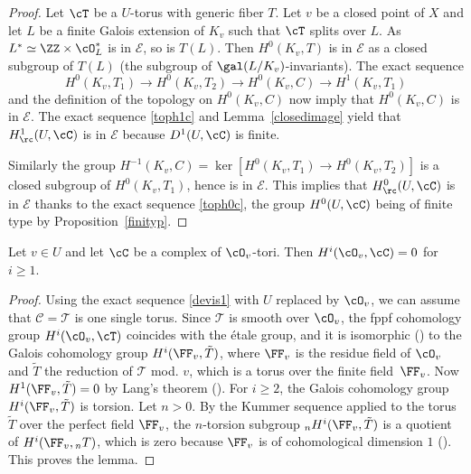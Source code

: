\begin{proof} Let $\cT$ be a
$U$-torus with generic fiber $T$.
Let $v$ be a closed point of $X$ and let $L$ be a finite
Galois extension of $K_v$ such
that $\cT$ splits over $L$. As $L^* \simeq \ZZ \times \cO_L^*$
is in $\mathcal E$, so is $T(L)$.
Then $H^0(K_v,T)$ is in $\mathcal E$
as a closed subgroup of $T(L)$ (the subgroup
of $\gal(L/K_v)$-invariants). The exact sequence
\[
H^0(K_v,T_1) \to H^0(K_v,T_2) \to H^0(K_v,C) \to H^1(K_v,T_1)
\]
and the definition of the topology on $H^0(K_v,C)$ now imply that
$H^0(K_v,C)$ is in $\mathcal E$. The exact sequence \eqref{toph1c}
and Lemma~\ref{closedimage} yield that $H^1_\rc(U,\cC)$ is in $\mathcal E$
because $D^1(U,\cC)$ is finite.

Similarly the group $H^{-1}(K_v,C)=\ker [H^0(K_v,T_1) \to H^0(K_v,T_2)]$ is
a closed subgroup of $H^0(K_v,T_1)$, hence is in $\mathcal E$.
This implies that $H^0_\rc(U,\cC)$ is in $\mathcal E$ thanks to the exact
sequence \eqref{toph0c},
the group $H^0(U,\cC)$ being of finite type by Proposition~\ref{finityp}.
\end{proof}

\begin{lem} \label{vanishlocal}
Let $v \in U$ and let $\cC$ be a complex of $\cO_v$-tori.
Then $H^i(\cO_v, \cC)=0$ for $i \geq 1$.
\end{lem}

\begin{proof} Using the exact sequence \eqref{devis1} with $U$ replaced
by $\cO_v$, we can assume that $\mathcal C=\mathcal T$ is one single
torus. Since $\mathcal T$ is smooth over $\cO_v$, the fppf
cohomology group $H^i(\cO_v, \cT)$ coincides with the étale
group, and it is isomorphic (\cite[Prop.\,II.1.1\,(b)]{MilADT})
to the Galois cohomology group
$H^i(\FF_v,\tilde T)$, where $\FF_v$
is the residue field of $\cO_v$ and $\tilde T$ the reduction of
$\mathcal T$ mod. $v$, which is a torus over the finite field~$\FF_v$. Now $H^1(\FF_v,\tilde T)=0$ by Lang's theorem (\cite{lang}).
For $i \geq 2$, the Galois cohomology group $H^i(\FF_v,\tilde T)$ is torsion.
Let $n >0$. By the Kummer sequence applied to the torus $\tilde T$
over the perfect field $\FF_v$, the $n$-torsion
subgroup $_n H^i(\FF_v,\tilde T)$ is a quotient of $H^i(\FF_v, {}_n T)$, which
is zero because $\FF_v$ is of cohomological dimension $1$ (\cite[Chap.\,XIII, Prop.\,2]{col}). This proves the lemma.
\end{proof}

